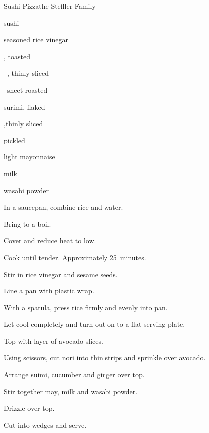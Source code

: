 \begin{recipe}{Sushi Pizza}{the Steffler Family}{}

\begin{ingredients}
\item {} sushi 
\item \C{\quarter} seasoned rice vinegar
\item {} , toasted 
\item \half~, thinly sliced
\item \half~sheet roasted 
\item \C{\threequarter} surimi, flaked 
\item \C{\half} ,thinly sliced
\item {} pickled 
\item {} light mayonnaise
\item {} milk
\item {} wasabi powder
\end{ingredients}

\begin{directions}
\item In a saucepan, combine rice and \C{1\quarter} water.
\item Bring to a boil.
\item Cover and reduce heat to low.
\item Cook until tender. Approximately 25~minutes.
\item Stir in rice vinegar and sesame seeds.
\item Line a pan with plastic wrap.
\item With a spatula, press rice firmly and evenly into pan.
\item Let cool completely and turn out on to a flat serving plate.
\item Top with layer of avocado slices.
\item Using scissors, cut nori into thin strips and sprinkle over avocado.
\item Arrange suimi, cucumber and ginger over top.
\item Stir together may, milk and wasabi powder.
\item Drizzle over top.
\item Cut into wedges and serve.
\end{directions}
\end{recipe}
